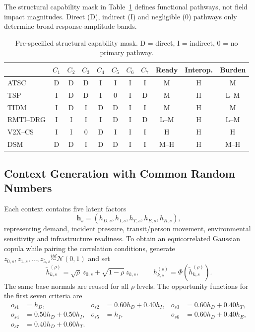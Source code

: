 \documentclass[runningheads]{llncs}
\begin{document}
The structural capability mask in Table~\ref{tab:mask} defines functional pathways, not field
impact magnitudes. Direct (D), indirect (I) and negligible (0) pathways only determine broad
response-amplitude bands.

\begin{table}[t]
\centering
\caption{Pre-specified structural capability mask. D = direct, I = indirect, 0 = no primary pathway.}
\label{tab:mask}
\scriptsize
\begin{tabular}{@{}lccccccc ccc@{}}
\toprule
 & $C_1$ & $C_2$ & $C_3$ & $C_4$ & $C_5$ & $C_6$ & $C_7$ & Ready & Interop. & Burden\\
\midrule
ATSC      & D & D & D & I & I & I & I & M   & H & M\\
TSP       & I & D & D & I & 0 & I & D & M   & H & L--M\\
TIDM      & I & D & I & D & D & I & I & M   & H & M\\
RMTI--DRG & I & I & I & I & D & I & D & L--M& H & L--M\\
V2X--CS   & I & I & 0 & D & I & I & I & H   & H & H\\
DSM       & D & D & I & D & D & I & I & M--H& H & M--H\\
\bottomrule
\end{tabular}
\end{table}

\subsection{Context Generation with Common Random Numbers}

Each context contains five latent factors
\begin{equation}
\mathbf h_s=(h_{D,s},h_{I,s},h_{T,s},h_{E,s},h_{R,s}),
\label{eq:latent}
\end{equation}
representing demand, incident pressure, transit/person movement, environmental sensitivity and
infrastructure readiness. To obtain an equicorrelated Gaussian copula while pairing the
correlation conditions, generate
$z_{0,s},z_{1,s},\ldots,z_{5,s}\overset{iid}{\sim}\mathcal N(0,1)$ and set
\begin{equation}
\tilde h_{k,s}^{(\rho)}
=\sqrt{\rho}\,z_{0,s}+\sqrt{1-\rho}\,z_{k,s},
\qquad
h_{k,s}^{(\rho)}=\Phi(\tilde h_{k,s}^{(\rho)}).
\label{eq:crn}
\end{equation}
The same base normals are reused for all $\rho$ levels. The opportunity functions for the
first seven criteria are
\begin{align}
o_{s1}&=h_D, &
o_{s2}&=0.60h_D+0.40h_I, &
o_{s3}&=0.60h_D+0.40h_T, \label{eq:opp1}\\
o_{s4}&=0.50h_D+0.50h_I, &
o_{s5}&=h_I, &
o_{s6}&=0.60h_D+0.40h_E, \label{eq:opp2}\\
o_{s7}&=0.40h_D+0.60h_T. \label{eq:opp3}
\end{align}
\end{document}
